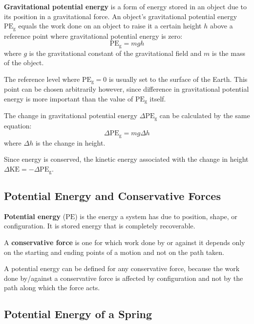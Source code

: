 \documentclass{article}
\newcommand{\definition}[1]{\begin{tcolorbox}[colback=red!5!white,colframe=red!75!black,parbox=false] #1 \end{tcolorbox}}
\begin{document}
\definition{\textbf{Gravitational potential energy} is a form of energy stored in an object due to its position in a gravitational force. An object's gravitational potential energy $\text{PE}_\text{g}$ equals the work done on an object to raise it a certain height $h$ above a reference point where gravitational potential energy is zero:
\begin{equation*}
	\text{PE}_{\text{g}}=mgh
\end{equation*}
where $g$ is the gravitational constant of the gravitational field and $m$ is the mass of the object.}

The reference level where $\text{PE}_\text{g}=0$ is usually set to the surface of the Earth. This point can be chosen arbitrarily however, since difference in gravitational potential energy is more important than the value of $\text{PE}_\text{g}$ itself.

The change in gravitational potential energy $\Delta \text{PE}_\text{g}$ can be calculated by the same equation:
\begin{equation*}
    \Delta \text{PE}_\text{g}=mg\Delta h
\end{equation*}
where $\Delta h$ is the change in height.

Since energy is conserved, the kinetic energy associated with the change in height $\Delta \text{KE}=-\Delta \text{PE}_\text{g}$.

\subsection{Potential Energy and Conservative Forces}

\definition{\textbf{Potential energy} ($\text{PE}$) is the energy a system has due to position, shape, or configuration. It is stored energy that is completely recoverable.}

\definition{A \textbf{conservative force} is one for which work done by or against it depends only on the starting and ending points of a motion and not on the path taken.}

A potential energy can be defined for any conservative force, because the work done by/against a conservative force is affected by configuration and not by the path along which the force acts.

\subsection{Potential Energy of a Spring}
\end{document}
